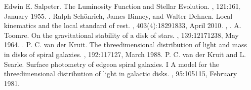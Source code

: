 \documentclass[letterpaper,10pt,english]{sphinxmanual}
\begin{document}
\begin{sphinxthebibliography}{10}
\sphinxAtStartPar
Edwin E. Salpeter. The Luminosity Function and Stellar Evolution. , 121:161, January 1955. .
\sphinxAtStartPar
Ralph Schönrich, James Binney, and Walter Dehnen. Local kinematics and the local standard of rest. , 403(4):1829\textendash{}1833, April 2010. , .
\sphinxAtStartPar
A. Toomre. On the gravitational stability of a disk of stars. , 139:1217\textendash{}1238, May 1964. .
\sphinxAtStartPar
P. C. van der Kruit. The three\sphinxhyphen{}dimensional distribution of light and mass in disks of spiral galaxies. , 192:117\textendash{}127, March 1988.
\sphinxAtStartPar
P. C. van der Kruit and L. Searle. Surface photometry of edge\sphinxhyphen{}on spiral galaxies. I \sphinxhyphen{} A model for the three\sphinxhyphen{}dimensional distribution of light in galactic disks. , 95:105\textendash{}115, February 1981.
\end{sphinxthebibliography}



\renewcommand{\indexname}{Index}
\printindex
\end{document}
